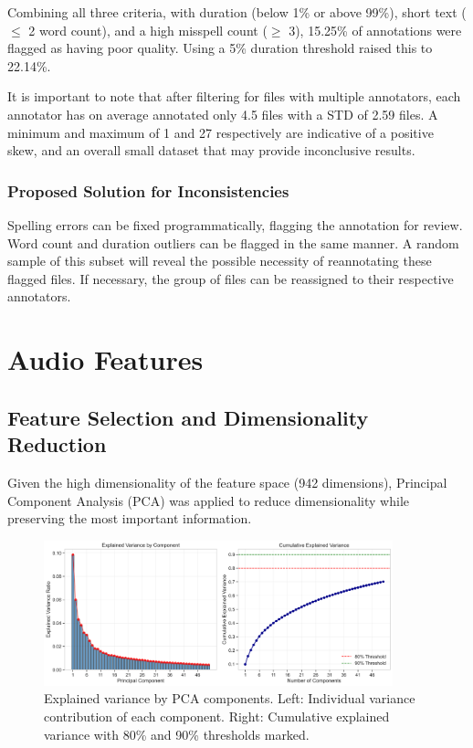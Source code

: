 \documentclass{article}
\begin{document}
Combining all three criteria, with duration (below 1\% or above 99\%), short text ($\leq$ 2 word count), and a high misspell count ($\geq$ 3), 15.25\% of annotations were flagged as having poor quality. Using a 5\% duration threshold raised this to 22.14\%.

It is important to note that after filtering for files with multiple annotators, each annotator has on average annotated only 4.5 files with a STD of 2.59 files. A minimum and maximum of 1 and 27 respectively are indicative of a positive skew, and an overall small dataset that may provide inconclusive results.

\subsubsection{Proposed Solution for Inconsistencies}

Spelling errors can be fixed programmatically, flagging the annotation for review. Word count and duration outliers can be flagged in the same manner. A random sample of this subset will reveal the possible necessity of reannotating these flagged files. If necessary, the group of files can be reassigned to their respective annotators.

\section{Audio Features}
\label{sec:audio_features}

\subsection{Feature Selection and Dimensionality Reduction}

Given the high dimensionality of the feature space (942 dimensions), Principal Component Analysis (PCA) was applied to reduce dimensionality while preserving the most important information.

\begin{figure}[ht]
  \centering
  \includegraphics[width=0.9\textwidth]{figures/audio_features/pca_explained_variance.png}
  \caption{Explained variance by PCA components. Left: Individual variance contribution of each component. Right: Cumulative explained variance with 80\% and 90\% thresholds marked.}
  \label{fig:pca_variance}
\end{figure}
\end{document}
